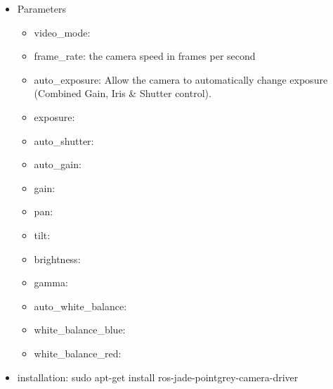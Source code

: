 \begin{itemize}
\item Parameters
\begin{itemize}
\item video\_mode:
\item frame\_rate:  the camera speed in frames per second
\item auto\_exposure:  Allow the camera to automatically change exposure (Combined Gain, Iris \& Shutter control).
\item exposure: 
\item auto\_shutter:
\item auto\_gain:
\item gain:
\item pan:
\item tilt:
\item brightness:
\item gamma:
\item auto\_white\_balance:
\item white\_balance\_blue:
\item white\_balance\_red:
\end{itemize}
\item installation: sudo apt-get install ros-jade-pointgrey-camera-driver
\end{itemize}
